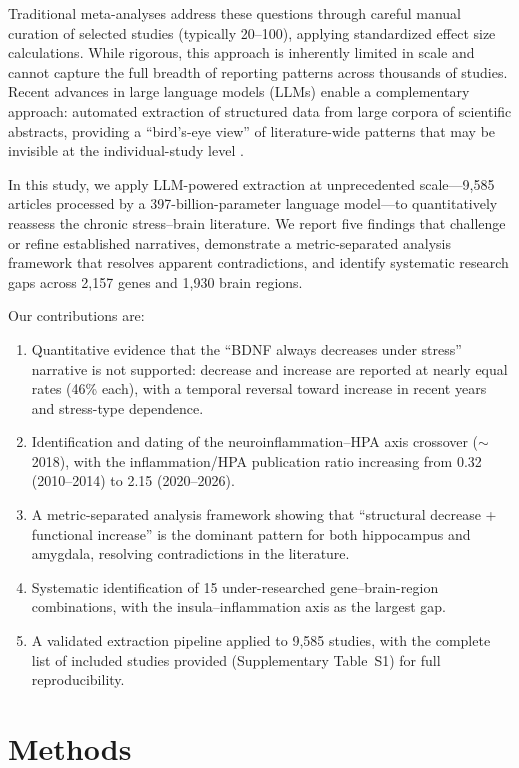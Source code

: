 \documentclass[12pt,a4paper]{article}
\begin{document}
Traditional meta-analyses address these questions through careful manual curation of selected studies (typically 20--100), applying standardized effect size calculations. While rigorous, this approach is inherently limited in scale and cannot capture the full breadth of reporting patterns across thousands of studies. Recent advances in large language models (LLMs) enable a complementary approach: automated extraction of structured data from large corpora of scientific abstracts, providing a ``bird's-eye view'' of literature-wide patterns that may be invisible at the individual-study level \citep{wang2023}.

In this study, we apply LLM-powered extraction at unprecedented scale---9,585 articles processed by a 397-billion-parameter language model---to quantitatively reassess the chronic stress--brain literature. We report five findings that challenge or refine established narratives, demonstrate a metric-separated analysis framework that resolves apparent contradictions, and identify systematic research gaps across 2,157 genes and 1,930 brain regions.

Our contributions are:
\begin{enumerate}
    \item Quantitative evidence that the ``BDNF always decreases under stress'' narrative is not supported: decrease and increase are reported at nearly equal rates (46\% each), with a temporal reversal toward increase in recent years and stress-type dependence.
    \item Identification and dating of the neuroinflammation--HPA axis crossover ($\sim$2018), with the inflammation/HPA publication ratio increasing from 0.32 (2010--2014) to 2.15 (2020--2026).
    \item A metric-separated analysis framework showing that ``structural decrease + functional increase'' is the dominant pattern for both hippocampus and amygdala, resolving contradictions in the literature.
    \item Systematic identification of 15 under-researched gene--brain-region combinations, with the insula--inflammation axis as the largest gap.
    \item A validated extraction pipeline applied to 9,585 studies, with the complete list of included studies provided (Supplementary Table~S1) for full reproducibility.
\end{enumerate}

\section{Methods}
\end{document}
